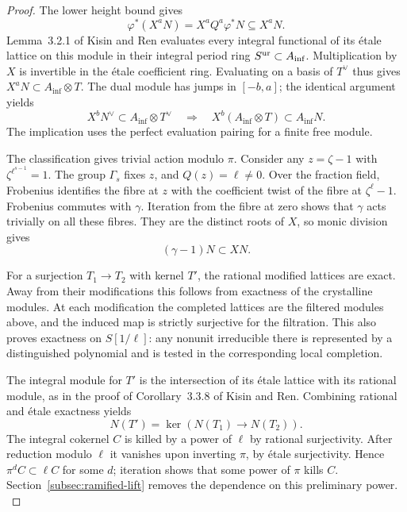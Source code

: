 \begin{proof}
The lower height bound gives
\[
      \varphi^*(X^a N)=X^aQ^a\varphi^*N\subseteq X^aN .
\] Lemma~3.2.1 of Kisin and Ren evaluates every integral functional of its étale lattice on this module in their integral period ring \(S^{\rm ur}\subset A_{\inf}\). Multiplication by \(X\) is invertible in the étale coefficient ring. Evaluating on a basis of \(T^\vee\) thus gives \(X^aN\subset A_{\inf}\otimes T\). The dual module has jumps in \([-b,a]\); the identical argument yields
\[
     X^bN^\vee\subset A_{\inf}\otimes T^\vee
        \quad\Longrightarrow\quad
     X^b(A_{\inf}\otimes T)\subset A_{\inf}N .
\]
The implication uses the perfect evaluation pairing for a finite free module. \cite[Lemma~3.2.1 and Corollary~3.3.8]{kisin-ren-lubin-tate}

The classification gives trivial action modulo \(\pi\). Consider any \(z=\zeta-1\) with \(\zeta^{\ell^{s-1}}=1\). The group \(\Gamma_s\) fixes \(z\), and \(Q(z)=\ell\ne0\). Over the fraction field, Frobenius identifies the fibre at \(z\) with the coefficient twist of the fibre at \(\zeta^\ell-1\). Frobenius commutes with \(\gamma\). Iteration from the fibre at zero shows that \(\gamma\) acts trivially on all these fibres. They are the distinct roots of \(X\), so monic division gives
\[
                         (\gamma-1)N\subset XN.
\]

For a surjection \(T_1\to T_2\) with kernel \(T'\), the rational modified lattices are exact. Away from their modifications this follows from exactness of the crystalline modules. At each modification the completed lattices are the filtered modules above, and the induced map is strictly surjective for the filtration. This also proves exactness on \(S[1/\ell]\): any nonunit irreducible there is represented by a distinguished polynomial and is tested in the corresponding local completion.

The integral module for \(T'\) is the intersection of its étale lattice with its rational module, as in the proof of Corollary~3.3.8 of Kisin and Ren. Combining rational and étale exactness yields
\[
                         N(T')=\ker(N(T_1)\longrightarrow N(T_2)).
\]
The integral cokernel \(C\) is killed by a power of \(\ell\) by rational surjectivity. After reduction modulo \(\ell\) it vanishes upon inverting \(\pi\), by étale surjectivity. Hence \(\pi^d C\subset\ell C\) for some \(d\); iteration shows that some power of \(\pi\) kills \(C\). Section~\ref{subsec:ramified-lift} removes the dependence on this preliminary power. \cite[Proposition~2.2.6 and Corollary~3.3.8]{kisin-ren-lubin-tate}
\end{proof}

